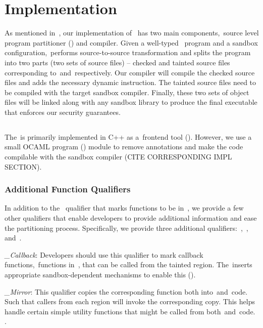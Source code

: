 \section{Implementation} \label{sec:implementation}
As mentioned in~, our implementation of~\systemname{} has two main components,~\ie source level program partitioner (\sourcerewriter) and compiler.
Given a well-typed~\systemname{} program and a sandbox configuration,~\sourcerewriter performs source-to-source transformation and splits the program into two parts (\ie two sets of source files) -- checked and tainted source files corresponding to~\cregion and~\ucregion respectively.
Our compiler will compile the checked source files and adds the necessary dynamic instruction.
The tainted source files need to be compiled with the target sandbox compiler.
Finally, these two sets of object files will be linked along with any sandbox library to produce the final executable that enforces our security guarantees.

\subsection{\sourcerewriter} \label{subsec:checkmate}
The~\sourcerewriter is primarily implemented in C++ as a~\clang frontend tool (\numcheckmatelines{}).
However, we use a small OCAML program (\numocamllines{}) module to remove annotations and make the code compilable with the sandbox compiler (CITE CORRESPONDING IMPL SECTION).

\subsubsection{Additional Function Qualifiers}
In addition to the~ qualifier that marks functions to be in~\ucregion, we provide a few other qualifiers that enable developers to provide additional information and ease the partitioning process.
Specifically, we provide three additional qualifiers:~,~, and~.

\noindent\emph{\_Callback}:
Developers should use this qualifier to mark callback functions,~\ie functions in~\cregion, that can be called from the tainted region. 
The~\sourcerewriter inserts appropriate sandbox-dependent mechanisms to enable this (\sect{}).

\noindent\emph{\_Mirror}: 
This qualifier copies the corresponding function both into~\cregion and~\ucregion code. Such that callers from each region will invoke the corresponding copy.
This helps handle certain simple utility functions that might be called from both~\cregion and~\ucregion code.
.

